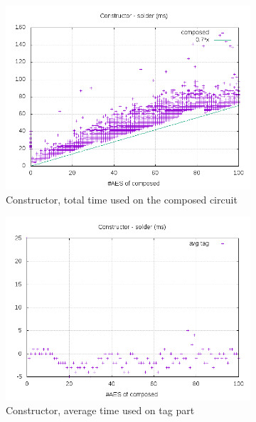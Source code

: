 \documentclass[10pt,a4paper]{article}
\begin{document}
\begin{figure}[h]
    \centering
    \begin{subfigure}[t]{0.3\textwidth}
        \includegraphics[width=\textwidth]{const_solder_plots}
        \caption{Constructor, total time used on the composed circuit}
    \end{subfigure}
    \begin{subfigure}[t]{0.3\textwidth}
        \includegraphics[width=\textwidth]{const_solder_avg}
        \caption{Constructor, average time used on tag part}
    \end{subfigure}
    \begin{subfigure}[t]{0.3\textwidth}

\end{subfigure}
\end{figure}
\end{document}
